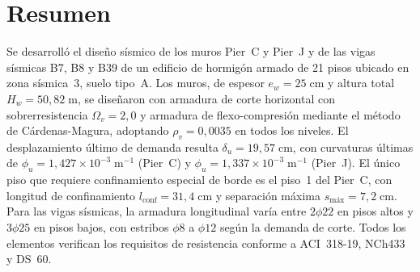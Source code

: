 \section*{Resumen}

Se desarrolló el diseño sísmico de los muros Pier~C y Pier~J y de las vigas sísmicas B7, B8 y B39
de un edificio de hormigón armado de 21 pisos ubicado en zona sísmica~3, suelo tipo~A. Los muros,
de espesor $e_w = 25\;\text{cm}$ y altura total $H_w = 50{,}82\;\text{m}$, se diseñaron con
armadura de corte horizontal con sobrerresistencia $\Omega_v = 2{,}0$ y armadura de
flexo-compresión mediante el método de Cárdenas-Magura, adoptando $\rho_v = 0{,}0035$ en todos
los niveles. El desplazamiento último de demanda resulta $\delta_u = 19{,}57\;\text{cm}$, con
curvaturas últimas de $\phi_u = 1{,}427 \times 10^{-3}\;\text{m}^{-1}$ (Pier~C) y
$\phi_u = 1{,}337 \times 10^{-3}\;\text{m}^{-1}$ (Pier~J). El único piso que requiere
confinamiento especial de borde es el piso~1 del Pier~C, con longitud de confinamiento
$l_\text{conf} = 31{,}4\;\text{cm}$ y separación máxima $s_\text{máx} = 7{,}2\;\text{cm}$.
Para las vigas sísmicas, la armadura longitudinal varía entre $2\phi22$ en pisos altos y $3\phi25$
en pisos bajos, con estribos $\phi8$ a $\phi12$ según la demanda de corte. Todos los elementos
verifican los requisitos de resistencia conforme a ACI~318-19, NCh433 y DS~60.